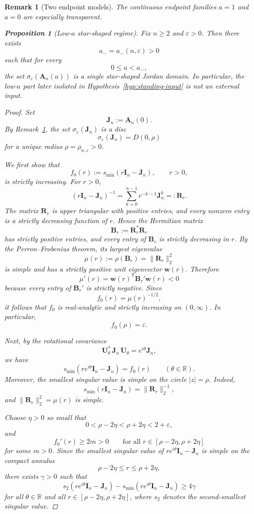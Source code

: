 \documentclass[11pt]{article}
\newtheorem{proposition}[theorem]{Proposition}
\newtheorem{remark}[theorem]{Remark}
\newcommand{\R}{\mathbb{R}}
\begin{document}
\begin{remark}[Two endpoint models]\label{rem:endpoints}
The continuous endpoint families \(a=1\) and \(a=0\) are especially transparent.

\begin{proposition}[Low-\(a\) star-shaped regime]\label{prop:low-a}
Fix \(n\ge 2\) and \(\varepsilon>0\). Then there exists
\[
a_-=a_-(n,\varepsilon)>0
\]
such that for every
\[
0\le a<a_-,
\]
the set \(\sigma_\varepsilon(\mathbf A_n(a))\) is a single star-shaped Jordan domain.
In particular, the low-\(a\) part later isolated in
Hypothesis~\ref{hyp:standing-input} is not an external input.
\end{proposition}

\begin{proof}
Set
\[
\mathbf J_n:=\mathbf A_n(0).
\]
By Remark~\ref{rem:endpoints}, the set \(\sigma_\varepsilon(\mathbf J_n)\) is a disc
\[
\sigma_\varepsilon(\mathbf J_n)=D(0,\rho)
\]
for a unique radius \(\rho=\rho_{n,\varepsilon}>0\).

We first show that
\[
f_0(r):=s_{\min}(r\mathbf I_n-\mathbf J_n),\qquad r>0,
\]
is strictly increasing. For \(r>0\),
\[
(r\mathbf I_n-\mathbf J_n)^{-1}
=
\sum_{k=0}^{n-1} r^{-k-1}\mathbf J_n^k
=: \mathbf R_r.
\]
The matrix \(\mathbf R_r\) is upper triangular with positive entries, and every nonzero entry is a strictly decreasing function of \(r\). Hence the Hermitian matrix
\[
\mathbf B_r:=\mathbf R_r^*\mathbf R_r
\]
has strictly positive entries, and every entry of \(\mathbf B_r\) is strictly decreasing in \(r\). By the Perron--Frobenius theorem, its largest eigenvalue
\[
\mu(r):=\rho(\mathbf B_r)=\|\mathbf R_r\|_2^2
\]
is simple and has a strictly positive unit eigenvector \(\mathbf w(r)\). Therefore
\[
\mu'(r)=\mathbf w(r)^{\mathsf T}\mathbf B_r'\mathbf w(r)<0
\]
because every entry of \(\mathbf B_r'\) is strictly negative. Since
\[
f_0(r)=\mu(r)^{-1/2},
\]
it follows that \(f_0\) is real-analytic and strictly increasing on \((0,\infty)\). In particular,
\[
f_0(\rho)=\varepsilon.
\]

Next, by the rotational covariance
\[
\mathbf U_\theta^*\,\mathbf J_n\,\mathbf U_\theta=e^{i\theta}\mathbf J_n,
\]
we have
\[
s_{\min}(re^{i\theta}\mathbf I_n-\mathbf J_n)=f_0(r)
\qquad (\theta\in\R).
\]
Moreover, the smallest singular value is simple on the circle \(|z|=\rho\). Indeed,
\[
s_{\min}(r\mathbf I_n-\mathbf J_n)=\|\mathbf R_r\|_2^{-1},
\]
and \(\|\mathbf R_r\|_2^2=\mu(r)\) is simple.

Choose \(\eta>0\) so small that
\[
0<\rho-2\eta<\rho+2\eta<2+\varepsilon,
\]
and
\[
f_0'(r)\ge 2m>0
\qquad \text{for all } r\in[\rho-2\eta,\rho+2\eta]
\]
for some \(m>0\). Since the smallest singular value of
\(re^{i\theta}\mathbf I_n-\mathbf J_n\) is simple on the compact annulus
\[
\rho-2\eta\le r\le \rho+2\eta,
\]
there exists \(\gamma>0\) such that
\[
s_2(re^{i\theta}\mathbf I_n-\mathbf J_n)-s_{\min}(re^{i\theta}\mathbf I_n-\mathbf J_n)\ge 4\gamma
\]
for all \(\theta\in\R\) and all \(r\in[\rho-2\eta,\rho+2\eta]\), where \(s_2\) denotes the second-smallest singular value.


\end{proof}
\end{remark}
\end{document}

